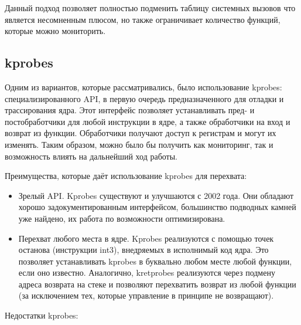 	Данный подход позволяет полностью подменить таблицу системных вызовов что является несомненным плюсом, но также ограничивает количество функций, которые можно мониторить.
	
	\subsection{kprobes}
	Одним из вариантов, которые рассматривались, было использование kprobes: специализированного API, в первую очередь предназначенного для отладки и трассирования ядра. Этот интерфейс позволяет устанавливать пред- и постобработчики для любой инструкции в ядре, а также обработчики на вход и возврат из функции. Обработчики получают доступ к регистрам и могут их изменять. Таким образом, можно было бы получить как мониторинг, так и возможность влиять на дальнейший ход работы.

	Преимущества, которые даёт использование kprobes для перехвата:
	\begin{itemize}
		\item Зрелый API. Kprobes существуют и улучшаются с 2002 года. Они обладают хорошо задокументированным интерфейсом, большинство подводных камней уже найдено, их работа по возможности оптимизирована.
		\item Перехват любого места в ядре. Kprobes реализуются с помощью точек останова (инструкции int3), внедряемых в исполнимый код ядра. Это позволяет устанавливать kprobes в буквально любом месте любой функции, если оно известно. Аналогично, kretprobes реализуются через подмену адреса возврата на стеке и позволяют перехватить возврат из любой функции (за исключением тех, которые управление в принципе не возвращают).
	\end{itemize}
	
	Недостатки kprobes:
	
